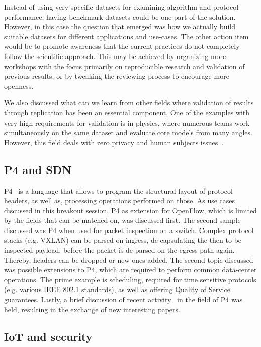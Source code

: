 Instead of using very specific datasets for examining algorithm and protocol
performance, having benchmark datasets could be one part of the solution.
However, in this case the question that emerged was how we actually build
suitable datasets for different applications and use-cases.  The other action
item would be to promote awareness that the current practices do not
completely follow the scientific approach. This may be achieved by organizing
more workshops with the focus primarily on reproducible research and
validation of previous results, or by tweaking the reviewing process to
encourage more openness.

We also discussed what can we learn from other fields where validation of
results through replication has been an essential component. One of the
examples with very high requirements for validation is in physics, where
numerous teams work simultaneously on the same dataset and evaluate core
models from many angles. However, this field deals with zero privacy and human
subjects issues~\cite{fbai:infocom:2003}.

\subsection{P4 and SDN}

P4~\cite{pbosshart:ccr:2014} is a language that allows to program the
structural layout of protocol headers, as well as, processing operations
performed on those.  As use cases discussed in this breakout session, P4 as
extension for OpenFlow, which is limited by the fields that can be matched on,
was discussed first. The second sample discussed was P4 when used for packet
inspection on a switch. Complex protocol stacks (e.g. VXLAN) can be parsed on
ingress, de-capsulating the then to be inspected payload, before the packet is
de-parsed on the egress path again. Thereby, headers can be dropped or new
ones added.  The second topic discussed was possible extensions to P4, which
are required to perform common data-center operations. The prime example is
scheduling, required for time sensitive protocols (e.g. various IEEE 802.1
standards), as well as offering Quality of Service guarantees.  Lastly, a
brief discussion of recent
activity~\cite{abhashkumar:sosr:2017,dang:sosr:2017,asivaraman:sigcomm:2016}
in the field of P4 was held, resulting in the exchange of new interesting
papers.

\subsection{IoT and security}


